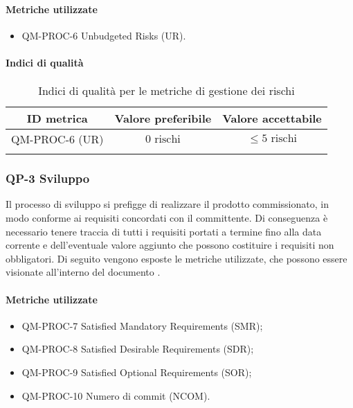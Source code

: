		\paragraph{Metriche utilizzate}

			\begin{itemize}
				\item QM-PROC-6 Unbudgeted Risks (UR).
			\end{itemize}

		\paragraph{Indici di qualità}

			\begin{center}
				\begin{longtable}{|c|c|c|}
				\hline
				\rowcolor{lighter-grayer}
				\textbf{ID metrica} & \textbf{Valore preferibile} & \textbf{Valore accettabile}\\
				\hline
				\endfirsthead
				\hline
				QM-PROC-6 (UR) & \(0 \text{ rischi}\) & \(\le 5 \text{ rischi}\) \\
				\hline
				\caption{Indici di qualità per le metriche di gestione dei rischi}
				\end{longtable}
			\end{center}
	\newpage
	\subsubsection{QP-3 Sviluppo}

		Il processo di sviluppo si prefigge di realizzare il prodotto commissionato, in modo conforme ai requisiti concordati con il committente.
		\newline
		Di conseguenza è necessario tenere traccia di tutti i requisiti portati a termine fino alla data corrente e dell'eventuale valore aggiunto che possono costituire i requisiti non obbligatori.
		\newline
		Di seguito vengono esposte le metriche utilizzate, che possono essere visionate all'interno del documento .

		\paragraph{Metriche utilizzate}

			\begin{itemize}
				\item QM-PROC-7 Satisfied Mandatory Requirements (SMR);
				\item QM-PROC-8 Satisfied Desirable Requirements (SDR);
				\item QM-PROC-9 Satisfied Optional Requirements (SOR);
				\item QM-PROC-10 Numero di commit (NCOM).
			\end{itemize}


